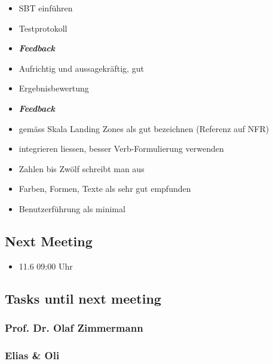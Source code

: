 \begin{itemize}
\item SBT einführen
\item Testprotokoll 
\item \emph{\textbf{Feedback}}
\item Aufrichtig und aussagekräftig, gut
\item Ergebnisbewertung 
\item \emph{\textbf{Feedback}}
\item gemäss Skala Landing Zones als gut bezeichnen (Referenz auf NFR)
\item integrieren liessen, besser Verb-Formulierung verwenden
\item Zahlen bis Zwölf schreibt man aus
\item Farben, Formen, Texte als sehr gut empfunden
\item Benutzerführung als minimal
\end{itemize}

\hypertarget{next-meeting}{%
\subsection*{Next Meeting}\label{next-meeting}}

\begin{itemize}
\item 11.6 09:00 Uhr
\end{itemize}

\hypertarget{tasks-until-next-meeting}{%
\subsection*{Tasks until next meeting}\label{tasks-until-next-meeting}}

\hypertarget{prof-dr-olaf-zimmermann}{%
\subsubsection*{Prof. Dr. Olaf
Zimmermann}\label{prof-dr-olaf-zimmermann}}

\hypertarget{elias--oli}{%
\subsubsection*{Elias \& Oli}\label{elias--oli}}
